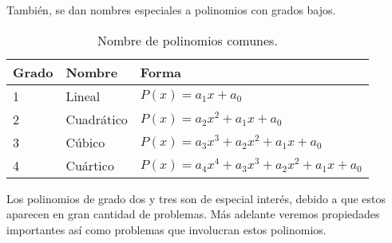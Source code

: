 También, se dan nombres especiales a polinomios con grados bajos.
\begin{table}[H]
    \centering
    \begin{tabular}{p{1.5cm} p{2.5cm} p{6.5cm}}
        \hline
        Grado & Nombre & Forma \\
        \hline \hline
        1 & Lineal & $P(x) = a_1 x + a_0$\\
        2 & Cuadrático & $P(x) = a_2 x^2 + a_1 x + a_0$\\
        3 & Cúbico & $P(x) = a_3 x^3 + a_2 x^2 + a_1 x + a_0$\\
        4 & Cuártico & $P(x) = a_4 x^4 + a_3 x^3 + a_2 x^2 + a_1 x + a_0$\\
        \hline
    \end{tabular}
    \caption{Nombre de polinomios comunes.}
\end{table}
Los polinomios de grado dos y tres son de especial interés, debido a que estos aparecen en gran cantidad de problemas.
Más adelante veremos propiedades importantes así como problemas que involucran estos polinomios.

